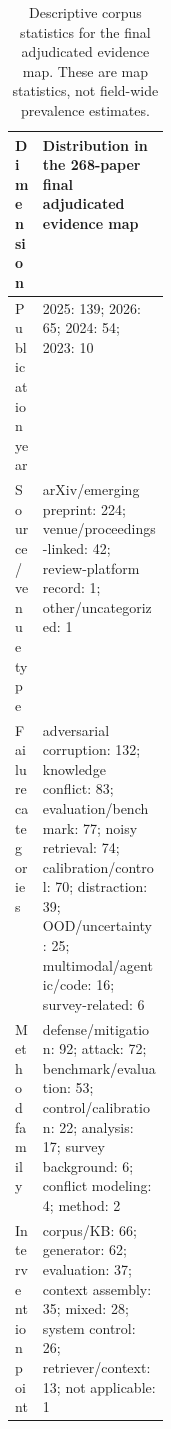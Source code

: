 \begin{table}[t]
\centering
\small
\begin{tabularx}{\linewidth}{p{0.18\linewidth}X}
\toprule
\textbf{Dimension} & \textbf{Distribution in the 268-paper final adjudicated evidence map} \\
\midrule
Publication year & 2025: 139; 2026: 65; 2024: 54; 2023: 10 \\
Source / venue type & arXiv/emerging preprint: 224; venue/proceedings-linked: 42; review-platform record: 1; other/uncategorized: 1 \\
Failure categories & adversarial corruption: 132; knowledge conflict: 83; evaluation/benchmark: 77; noisy retrieval: 74; calibration/control: 70; distraction: 39; OOD/uncertainty: 25; multimodal/agentic/code: 16; survey-related: 6 \\
Method family & defense/mitigation: 92; attack: 72; benchmark/evaluation: 53; control/calibration: 22; analysis: 17; survey background: 6; conflict modeling: 4; method: 2 \\
Intervention point & corpus/KB: 66; generator: 62; evaluation: 37; context assembly: 35; mixed: 28; system control: 26; retriever/context: 13; not applicable: 1 \\
\bottomrule
\end{tabularx}
\caption{Descriptive corpus statistics for the final adjudicated evidence map. These are map statistics, not field-wide prevalence estimates.}
\label{tab:corpus-stats}
\end{table}
